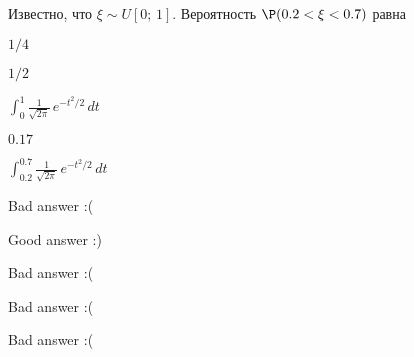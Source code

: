 
\begin{question}
Известно, что \(\xi \sim U[0;\,1]\). Вероятность \(\P(0.2<\xi<0.7)\)
равна
\begin{answerlist}
  \item \(1/4\)
  \item \(1/2\)
  \item \(\int_{0}^{1}\frac{1}{\sqrt{2\pi}}\,e^{-t^2/2}\,dt\)
  \item \(0.17\)
  \item \(\int_{0.2}^{0.7}\frac{1}{\sqrt{2\pi}}\,e^{-t^2/2}\,dt\)
\end{answerlist}
\end{question}

\begin{solution}
\begin{answerlist}
  \item Bad answer :(
  \item Good answer :)
  \item Bad answer :(
  \item Bad answer :(
  \item Bad answer :(
\end{answerlist}
\end{solution}

